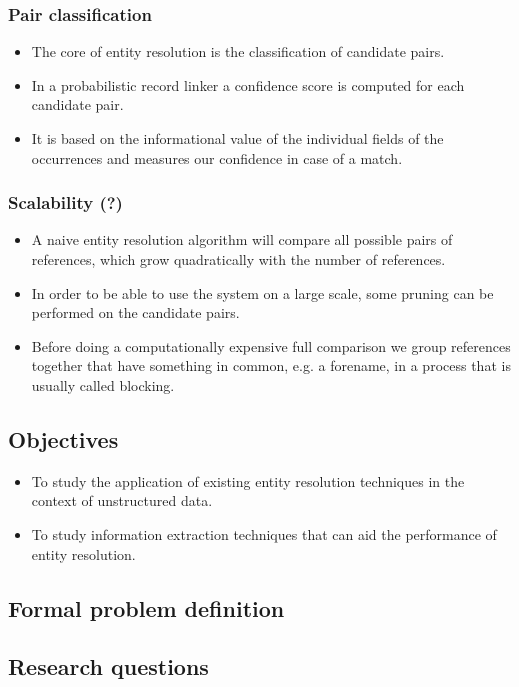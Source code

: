 \documentclass[paper=a4, fontsize=11pt]{scrartcl}					%
\numberwithin{equation}{section}					%
\numberwithin{figure}{section}						%
\numberwithin{table}{section}						%
\begin{document}
\subsubsection{Pair classification}
\begin{itemize}
	\item The core of entity resolution is the classification of candidate pairs.
	\item In a probabilistic record linker a confidence score is computed for each candidate pair.
	\item It is based on the informational value of the individual fields of the occurrences and measures our confidence in case of a match.
\end{itemize}

\subsubsection{Scalability (?)}
\begin{itemize}
	\item A naive entity resolution algorithm will compare all possible pairs of references, which grow quadratically with the number of references.
	\item In order to be able to use the system on a large scale, some pruning can be performed on the candidate pairs.
	\item Before doing a computationally expensive full comparison we group references together that have something in common, e.g. a forename, in a process that is usually called blocking.
\end{itemize}

\subsection{Objectives}
\begin{itemize}
	\item To study the application of existing entity resolution techniques in the context of unstructured data.
	\item To study information extraction techniques that can aid the performance of entity resolution.
\end{itemize}

\subsection{Formal problem definition}

\subsection{Research questions}
\end{document}

